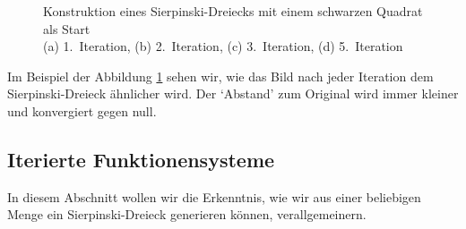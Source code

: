 \begin{figure}	
	\centering
	\caption{Konstruktion eines Sierpinski-Dreiecks mit einem schwarzen Quadrat als Start\\
		(a) 1.~Iteration, (b) 2.~Iteration, (c) 3.~Iteration, (d) 5.~Iteration}
	\label{ifs:sierpconst}
\end{figure}
Im Beispiel der Abbildung \ref{ifs:sierpconst} sehen wir, wie das Bild nach jeder Iteration dem Sierpinski-Dreieck ähnlicher wird.
Der `Abstand' zum Original wird immer kleiner und konvergiert gegen null.

\subsection{Iterierte Funktionensysteme
\label{ifs:subsection:IteratedFunktionensysteme}}
%
In diesem Abschnitt wollen wir die Erkenntnis, wie wir aus einer beliebigen Menge ein Sierpinski-Dreieck generieren können, verallgemeinern.


